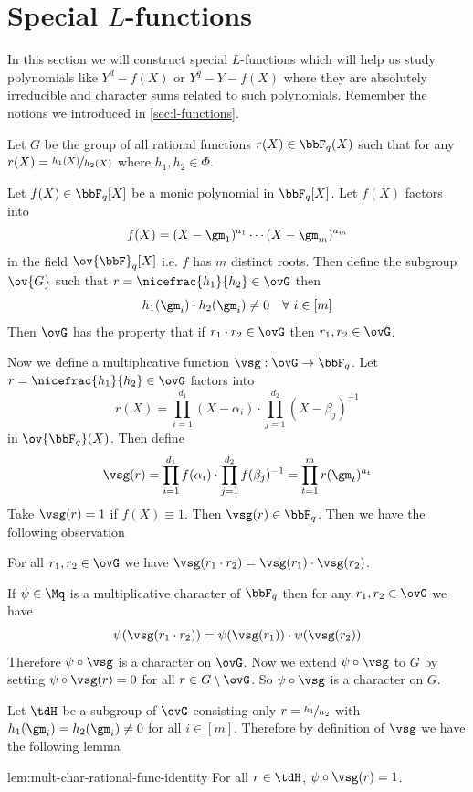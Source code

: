 \section{Special \texorpdfstring{$L$}{L}-functions}
In this section we will construct special $L$-functions which will help us study polynomials like $Y^d-f(X)$ or $Y^q-Y-f(X)$ where they are absolutely irreducible and character sums related to such polynomials. Remember the notions we introduced in \autoref{sec:l-functions}.

Let $G$ be the group of all rational functions $r(X)\in\bbF_q(X)$ such that for any $r(X)=\nicefrac{h_1(X)}{h_2(X)}$ where $h_1,h_2\in\Phi$. 

Let $f(X)\in\bbF_q[X]$ be a monic polynomial in $\bbF_q[X]$. Let $f(X)$ factors into $$f(X)=(X-\gm_1)^{a_1}\cdots (X-\gm_m)^{a_m}$$ in the field $\ov{\bbF}_q[X]$ i.e. $f$ has $m$ distinct roots. Then define the subgroup $\ov{G}$ such that $r=\nicefrac{h_1}{h_2}\in\ovG$ then $$h_1(\gm_i)\cdot h_2(\gm_i)\neq 0\quad\forall\ i\in[m]$$Then $\ovG$ has the property that if $r_1\cdot r_2\in\ovG$ then $r_1,r_2\in \ovG$. 

Now we define a multiplicative function $\vsg:\ovG\to \bbF_q$. Let $r=\nicefrac{h_1}{h_2}\in\ovG$ factors into $$r(X)=\prod_{i=1}^{d_1}(X-\alpha_i)\cdot \prod_{j=1}^{d_2}(X-\beta_j)^{-1}$$ in $\ov{\bbF_q}(X)$. Then define $$\vsg(r)=\prod_{i=1}^{d_1}f(\alpha_i)\cdot \prod_{j=1}^{d_2}f(\beta_j)^{-1}=\prod_{t=1}^mr(\gm_t)^{a_t}$$Take $\vsg(r)=1$ if $f(X)\equiv 1$. Then $\vsg(r)\in\bbF_q$. Then we have the following observation
\begin{observation}
  For all  $r_1,r_2\in\ovG$ we have $\vsg(r_1\cdot r_2)=\vsg(r_1)\cdot \vsg(r_2)$. 
\end{observation}
If $\psi\in\Mq$ is a multiplicative character of $\bbF_q$ then for any $r_1,r_2\in\ovG$ we have $$\psi(\vsg(r_1\cdot r_2))=\psi(\vsg(r_1))\cdot \psi(\vsg(r_2))$$Therefore $\psi\circ \vsg$ is a character on $\ovG$. Now we extend $\psi\circ\vsg$ to $G$ by setting $\psi\circ\vsg(r)=0$ for all $r\in G\setminus \ovG$. So $\psi\circ \vsg$ is a character on $G$. 

Let $\tdH$ be a subgroup of $\ovG$ consisting only $r=\nicefrac{h_1}{h_2}$ with $h_1(\gm_i)=h_2(\gm_i)\neq 0$ for all $i\in[m]$. Therefore by definition of $\vsg$ we have the following lemma 
\begin{lemma}{}{lem:mult-char-rational-func-identity}
  For all $r\in\tdH$, $\psi\circ \vsg(r)=1$. 
\end{lemma}

